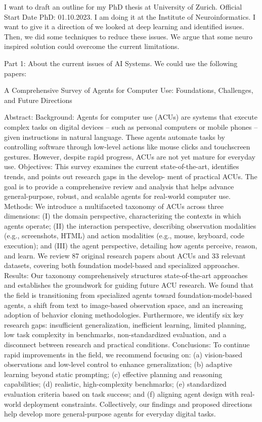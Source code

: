 I want to draft an outline for my PhD thesis at University of Zurich. Official Start Date PhD: 01.10.2023. I am doing it at the Institute of Neuroinformatics. I want to give it a direction of we looked at deep learning and identified issues. Then, we did some techniques to reduce these issues. We argue that some neuro inspired solution could overcome the current limitations.

Part 1: About the current issues of AI Systems. We could use the following papers:


A Comprehensive Survey of Agents for Computer Use: Foundations, Challenges, and Future Directions

Abstract: Background: Agents for computer use (ACUs) are systems that execute complex tasks on digital devices – such as personal
computers or mobile phones – given instructions in natural language. These agents automate tasks by controlling software
through low-level actions like mouse clicks and touchscreen gestures. However, despite rapid progress, ACUs are not yet
mature for everyday use.
Objectives: This survey examines the current state-of-the-art, identifies trends, and points out research gaps in the develop-
ment of practical ACUs. The goal is to provide a comprehensive review and analysis that helps advance general-purpose,
robust, and scalable agents for real-world computer use.
Methods: We introduce a multifaceted taxonomy of ACUs across three dimensions: (I) the domain perspective, characterizing
the contexts in which agents operate; (II) the interaction perspective, describing observation modalities (e.g., screenshots,
HTML) and action modalities (e.g., mouse, keyboard, code execution); and (III) the agent perspective, detailing how agents
perceive, reason, and learn. We review 87 original research papers about ACUs and 33 relevant datasets, covering both
foundation model-based and specialized approaches.
Results: Our taxonomy comprehensively structures state-of-the-art approaches and establishes the groundwork for guiding
future ACU research. We found that the field is transitioning from specialized agents toward foundation-model-based agents, a
shift from text to image-based observation space, and an increasing adoption of behavior cloning methodologies. Furthermore,
we identify six key research gaps: insufficient generalization, inefficient learning, limited planning, low task complexity in
benchmarks, non-standardized evaluation, and a disconnect between research and practical conditions.
Conclusions: To continue rapid improvements in the field, we recommend focusing on: (a) vision-based observations and
low-level control to enhance generalization; (b) adaptive learning beyond static prompting; (c) effective planning and reasoning
capabilities; (d) realistic, high-complexity benchmarks; (e) standardized evaluation criteria based on task success; and (f)
aligning agent design with real-world deployment constraints. Collectively, our findings and proposed directions help develop
more general-purpose agents for everyday digital tasks.

